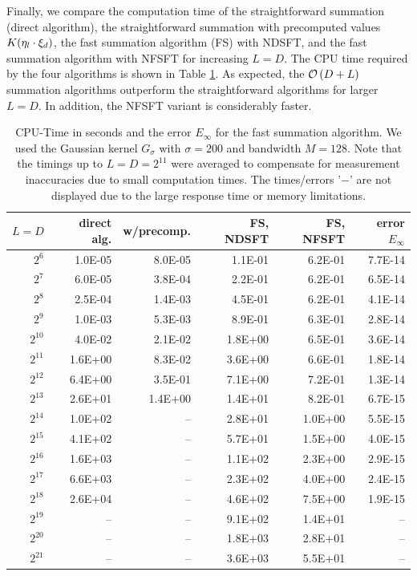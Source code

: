 Finally, we compare the computation time of the straightforward summation 
(direct algorithm), the straightforward summation with precomputed values 
$K{\hspace{-0.4ex}}\left(\mathbf{\eta}_{l} \cdot \mathbf{\xi}_{d}\right)$, the fast summation algorithm (FS) 
with NDSFT, and the fast summation algorithm with NFSFT for increasing $L=D$.
The CPU time required by the four algorithms is shown in Table 
\ref{tab:TimeSpace}. As expected, the $\mathcal{O}\left(D + L\right)$ summation algorithms outperform the
straightforward algorithms for larger $L=D$. In addition, the NFSFT variant is 
considerably faster.

\begin{table}[h]
  \begin{center}
    \begin{tabular}{r|r|r|r|r|r}
        $L = D$ & direct alg. & w/precomp. & FS, NDSFT & FS, NFSFT & error $E_{\infty}$\\\hline
           $2^6$ & 1.0E-05 & 8.0E-05 & 1.1E-01 & 6.2E-01 & 7.7E-14\\
           $2^7$ & 6.0E-05 & 3.8E-04 & 2.2E-01 & 6.2E-01 & 6.5E-14\\
           $2^8$ & 2.5E-04 & 1.4E-03 & 4.5E-01 & 6.2E-01 & 4.1E-14\\
           $2^9$ & 1.0E-03 & 5.3E-03 & 8.9E-01 & 6.3E-01 & 2.8E-14\\
      $2^{10}$ & 4.0E-02 & 2.1E-02 & 1.8E+00 & 6.5E-01 & 3.6E-14\\
      $2^{11}$ & 1.6E+00 & 8.3E-02 & 3.6E+00 & 6.6E-01 & 1.8E-14\\
      $2^{12}$ & 6.4E+00 & 3.5E-01 & 7.1E+00 & 7.2E-01 & 1.3E-14\\
      $2^{13}$ & 2.6E+01 & 1.4E+00 & 1.4E+01 & 8.2E-01 & 6.7E-15\\
     $2^{14}$ & 1.0E+02 & -- & 2.8E+01 & 1.0E+00 & 5.5E-15\\
     $2^{15}$ & 4.1E+02 & -- & 5.7E+01 & 1.5E+00 & 4.0E-15\\
     $2^{16}$ & 1.6E+03 & -- & 1.1E+02 & 2.3E+00 & 2.9E-15\\
     $2^{17}$ & 6.6E+03 & -- & 2.3E+02 & 4.0E+00 & 2.4E-15\\
     $2^{18}$ & 2.6E+04 & -- & 4.6E+02 & 7.5E+00 & 1.9E-15\\
     $2^{19}$ & -- & -- & 9.1E+02 & 1.4E+01 & --\\
     $2^{20}$ & -- & -- & 1.8E+03 & 2.8E+01 & --\\
     $2^{21}$ & -- & -- & 3.6E+03 & 5.5E+01 & --\\
    \end{tabular}
  \end{center}
  \caption{CPU-Time in seconds and the error $E_{\infty}$ for the fast summation algorithm. We used 
    the Gaussian kernel $G_{\sigma}$ with $\sigma=200$ and bandwidth $M = 128$. Note that the timings up to $L=D=2^11$ were 
    averaged to compensate for measurement inaccuracies due to small computation times. The
    times/errors '$-$' are not displayed due to the large response time or memory limitations.}
  \label{tab:TimeSpace}
\end{table}


